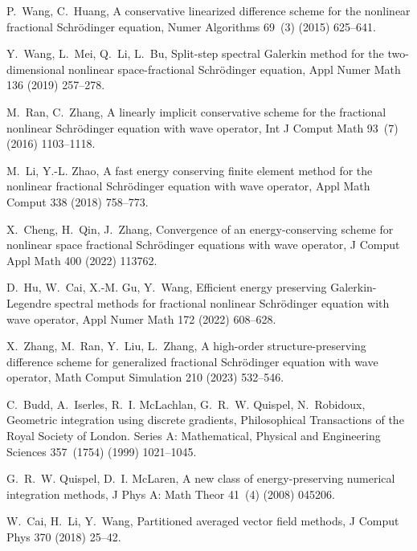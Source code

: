 \documentclass[preprint,compress,3p,10pt,fleqn]{elsarticle}
\numberwithin{equation}{section}
\begin{document}
\begin{thebibliography}{10}
	P.~Wang, C.~Huang, A conservative linearized difference scheme for the nonlinear fractional
	  Schr\"odinger equation, Numer Algorithms 69~(3) (2015) 625--641.
	
	Y.~Wang, L.~Mei, Q.~Li, L.~Bu, Split-step spectral Galerkin method for the two-dimensional nonlinear
	  space-fractional Schr\"odinger equation, Appl Numer Math 136 (2019) 257--278.
	
	M.~Ran, C.~Zhang, A  linearly implicit conservative scheme for the fractional nonlinear
	  Schr\"odinger equation with wave operator, Int J Comput Math 93~(7) (2016) 1103--1118.
	
	M.~Li, Y.-L. Zhao, A fast energy conserving finite element method for the nonlinear fractional
	  Schr\"odinger equation with wave operator, Appl Math Comput 338 (2018) 758--773.
	
	X.~Cheng, H.~Qin, J.~Zhang,  Convergence of an energy-conserving scheme for nonlinear space fractional
	  Schr\"odinger equations with wave operator, J Comput Appl Math 400 (2022) 113762.

	D.~Hu, W.~Cai, X.-M. Gu, Y.~Wang,  Efficient energy preserving Galerkin-Legendre spectral methods for
	  fractional nonlinear Schr\"odinger equation with wave operator, Appl Numer Math 172 (2022) 608--628.

	X.~Zhang, M.~Ran, Y.~Liu, L.~Zhang, A high-order structure-preserving difference scheme for generalized fractional
	  Schr\"odinger equation with wave operator, Math Comput Simulation 210 (2023) 532--546.

	C.~Budd, A.~Iserles, R.~I. McLachlan, G.~R.~W. Quispel, N.~Robidoux,
	  Geometric integration using discrete gradients, Philosophical Transactions of the
	  Royal Society of London. Series A: Mathematical, Physical and Engineering
	  Sciences 357~(1754) (1999) 1021--1045.

	G.~R.~W. Quispel, D.~I. McLaren, A new  class of energy-preserving numerical integration methods, J Phys A: Math
	  Theor 41~(4) (2008) 045206.

	W.~Cai, H.~Li, Y.~Wang, Partitioned averaged vector field methods, J Comput Phys 370 (2018) 25--42.


\end{thebibliography}
\end{document}

